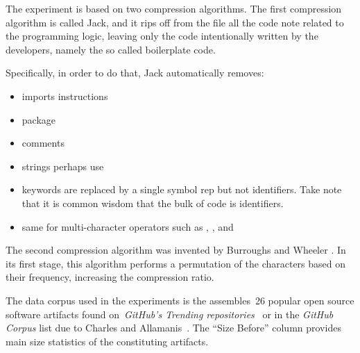 
The experiment is based on two compression algorithms.
The first compression algorithm is called Jack, and it rips off from the file all the code note related to the programming logic, leaving
only the code intentionally written by the developers, namely the so called boilerplate code.

Specifically, in order to do that, Jack automatically removes:

\begin{itemize}
  \item imports instructions
  \item package
  \item comments
  \item strings perhaps use
  \item keywords are replaced by a single symbol rep
        but not identifiers. Take note that it is common wisdom that the bulk of code is identifiers.
  \item same for multi-character operators such as \cc{->}, \cc{[]}, and \cc{<<<<=}
\end{itemize}

The second compression algorithm was invented by Burroughs and Wheeler
\cite{Burrows:Wheeler:94}.  In its first stage, this algorithm performs a
permutation of the characters based on their frequency, increasing the
compression ratio.

The data corpus used in the experiments is the assembles~26 popular \Java open
source software artifacts found on~\emph{GitHub's Trending
repositories}~ or in
the \emph{GitHub \Java Corpus} list due to Charles and
Allamanis~\cite{Charles:Allamanis:2013}.
The ``Size Before'' column  provides main size statistics of
the constituting artifacts.

\begin{table}
  \label{table:corpus}
  \caption{The results of the compression using the Burroughs-Wheeler algorithm}
  \centering
\end{table}

